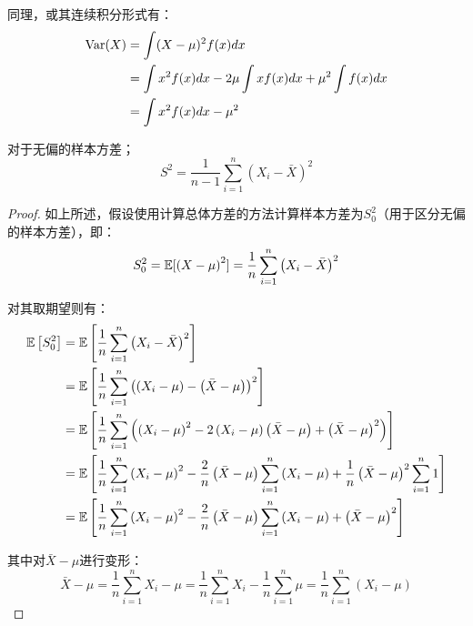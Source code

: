 \documentclass[11pt]{article}
\begin{document}
同理，或其连续积分形式有：
\begin{align*}
    \operatorname{Var}(X) &= \int (X-\mu)^2 f(x) dx \\
    &= \int x^2 f(x) dx - 2\mu \int xf(x)dx + \mu^2 \int f(x)dx \\
    &= \int x^2 f(x) dx - \mu^2
\end{align*}

对于无偏的样本方差；
\begin{equation*}
    S^2 = \frac{1}{n-1} \sum_{i=1}^{n} \left(X_i - \bar{X} \right)^2
\end{equation*}

\begin{proof}
    如上所述，假设使用计算总体方差的方法计算样本方差为$S_0^2$（用于区分无偏的样本方差），即：
    \begin{equation*}
        S_0^2 = \mathbb{E}[\left(X - \mu \right)^2]
        = \frac{1}{n} \sum_{i=1}^{n} \left( X_i - \bar{X} \right)^2
    \end{equation*}

    对其取期望则有：
    \begin{align*}
        \mathbb{E}\left[S_0^2\right] 
        &= \mathbb{E} \left[\frac{1}{n} \sum_{i=1}^{n} \left( X_i - \bar{X} \right)^2 \right] \\
        &= \mathbb{E} \left[\frac{1}{n} \sum_{i=1}^{n} \left( \left( X_i - \mu \right) - \left( \bar{X} - \mu \right) \right)^2 \right] \\
        &= \mathbb{E} \left[\frac{1}{n} \sum_{i=1}^{n} \left( \left( X_i - \mu \right)^2 - 2 \left( X_i - \mu \right) \left( \bar{X} - \mu \right) + \left( \bar{X} - \mu \right)^2 \right) \right] \\
        &= \mathbb{E} \left[\frac{1}{n} \sum_{i=1}^{n} \left( X_i - \mu \right)^2 - \frac{2}{n} \left( \bar{X} - \mu \right) \sum_{i=1}^{n} \left( X_i - \mu \right) + \frac{1}{n} \left( \bar{X} - \mu \right)^2 \sum_{i=1}^{n} 1 \right] \\
        &= \mathbb{E} \left[\frac{1}{n} \sum_{i=1}^{n} \left( X_i - \mu \right)^2 - \frac{2}{n} \left( \bar{X} - \mu \right) \sum_{i=1}^{n} \left( X_i - \mu \right) + \left( \bar{X} - \mu \right)^2 \right]
    \end{align*}
    
    其中对$\bar{X} - \mu$进行变形：
    \begin{equation*}
        \bar{X} - \mu = \frac{1}{n} \sum_{i=1}^{n} X_i - \mu
        = \frac{1}{n} \sum_{i=1}^{n} X_i - \frac{1}{n} \sum_{i=1}^{n}\mu
        = \frac{1}{n} \sum_{i=1}^{n} \left( X_i - \mu \right)
    \end{equation*}


\end{proof}
\end{document}

